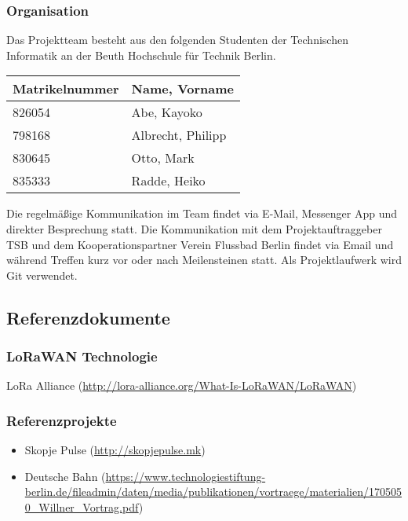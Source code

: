 \subsubsection{Organisation}

Das Projektteam besteht aus den folgenden Studenten der Technischen Informatik an der Beuth Hochschule für Technik Berlin.

\begin{table}[H]
	\centering
	\begin{tabular}{ |l|l| }
		\hline  %
		\rowcolor[gray]{.8}%
		\rule{0pt}{18pt}%
		\textbf{Matrikelnummer} & \textbf{Name, Vorname} \\
		\hline  %
		826054 & Abe, Kayoko \\
		\hline
		798168 & Albrecht, Philipp \\
		\hline
		830645 & Otto, Mark \\
		\hline
		835333 & Radde, Heiko \\
		\hline
	\end{tabular}
\end{table}

Die regelmäßige Kommunikation im Team findet via E-Mail, Messenger App und direkter Besprechung statt. Die Kommunikation mit dem Projektauftraggeber TSB und dem Kooperationspartner Verein Flussbad Berlin findet via Email und während Treffen kurz vor oder nach Meilensteinen statt.
Als Projektlaufwerk wird Git verwendet.

\subsection{Referenzdokumente}

\subsubsection*{LoRaWAN Technologie}
LoRa Alliance (\url{http://lora-alliance.org/What-Is-LoRaWAN/LoRaWAN})

\subsubsection*{Referenzprojekte}
\begin{itemize}[noitemsep]
	\item Skopje Pulse (\url{http://skopjepulse.mk})
	\item Deutsche Bahn (\url{https://www.technologiestiftung-berlin.de/fileadmin/daten/media/publikationen/vortraege/materialien/1705050_Willner_Vortrag.pdf})
\end{itemize}

